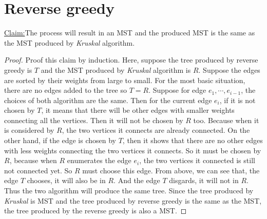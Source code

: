 \documentclass{article}
\newenvironment{claim}[1]{\par\noindent\underline{Claim:}\space#1}{}
\begin{document}
	\section{Reverse greedy}
		\begin{claim}The process will result in an MST and the produced MST is the same as the MST produced by \emph{Kruskal} algorithm.\end{claim}
		\begin{proof}
			Proof this claim by induction. Here, suppose the tree produced by reverse greedy is $T$ and the MST produced by \emph{Kruskal} algorithm is $R$. Suppose the edges are sorted by their weights from large to small. \newline
			For the most basic situation, there are no edges added to the tree so $T = R$.\newline
			Suppose for edge $e_1, \cdots, e_{i - 1}$, the choices of both algorithm  are the same. Then for the current edge $e_i$, if it is not chosen by $T$, it means that there will be other edges with smaller weights connecting all the vertices. Then it will not be chosen by $R$ too. Because when it is considered by $R$, the two vertices it connects are already connected. On the other hand, if the edge is chosen by $T$, then it shows that there are no other edges with less weights connecting the two vertices it connects. So it must be chosen by $R$, because when $R$ enumerates the edge $e_i$, the two vertices it connected is still not connected yet. So $R$ must choose this edge. From above, we can see that, the edge $T$ chooses, it will also be in $R$. And the edge $T$ disgards, it will not in $R$. Thus the two algorithm will produce the same tree. \newline
			Since the tree produced by \emph{Kruskal} is MST and the tree produced by reverse greedy is the same as the MST, the tree produced by the reverse greedy is also a MST.
		\end{proof}
\end{document}
